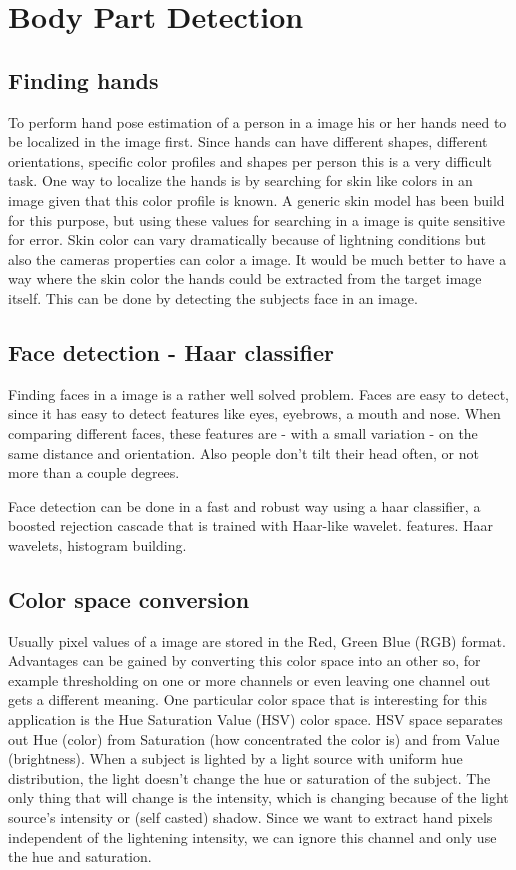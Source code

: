 
\chapter{Body Part Detection}
\label{ch:bodyparts}


\section{Finding hands}
To perform hand pose estimation of a person in a image his or her hands need to be localized in the image first. Since hands can have different shapes, different orientations, specific color profiles and shapes per person this is a very difficult task. One way to localize the hands is by searching for skin like colors in an image given that this color profile is known. A generic skin model has been build for this purpose\cite{Jones99statisticalcolor}, but using these values for searching in a image is quite sensitive for error. Skin color can vary dramatically because of lightning conditions but also the cameras properties can color a image. It would be much better to have a way where the skin color the hands could be extracted from the target image itself. This can be done by detecting the subjects face in an image.

\section{Face detection - Haar classifier}
Finding faces in a image is a rather well solved problem. Faces are easy to detect, since it has easy to detect features like eyes, eyebrows, a mouth and nose. When comparing different faces, these features are - with a small variation - on the same distance and orientation. Also people don't tilt their head often, or not more than a couple degrees.

Face detection can be done in a fast and robust way using a haar classifier, a boosted rejection cascade that is trained with Haar-like wavelet.
 features\cite{Lienhart02anextended}. Haar wavelets, histogram building.


\section{Color space conversion}
Usually pixel values of a image are stored in the Red, Green Blue (RGB) format. Advantages can be gained by converting this color space into an other so, for example thresholding on one or more channels or even leaving one channel out gets a different meaning. One particular color space that is interesting for this application is the Hue Saturation Value (HSV) color space. HSV space separates out Hue (color) from Saturation (how concentrated the color is) and from Value (brightness). When a subject is lighted by a light source with uniform hue distribution, the light doesn't change the hue or saturation of the subject. The only thing that will change is the intensity, which is changing because of the light source's intensity or (self casted) shadow. Since we want to extract hand pixels independent of the lightening intensity, we can ignore this channel and only use the hue and saturation.

